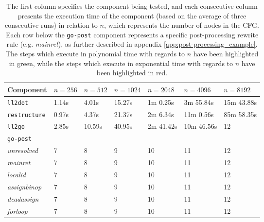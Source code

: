 \begin{table}[htbp]
	\begin{center}
		\begin{tabular}{|l|l|l|l|l|l|l|}
			\hline
			Component & $ n = 256 $ & $ n = 512 $ & $ n = 1024 $ & $ n = 2048 $ & $ n = 4096 $ & $ n = 8192 $ \\
			\hline
			\rowcolor{light_green_3}
			\texttt{ll2dot} & 1.14s & 4.01s & 15.27s & 1m 0.25s & 3m 55.84s & 15m 43.88s \\
			\rowcolor{light_green_3}
			\texttt{restructure} & 0.97s & 4.37s & 21.37s & 2m 6.34s & 11m 0.56s & 85m 58.35s \\
			\rowcolor{light_green_3}
			\texttt{ll2go} & 2.85s & 10.59s & 40.95s & 2m 41.42s & 10m 46.56s & 12 \\
			\hline
			\multicolumn{7}{|l|}{\texttt{go-post}} \\
			\hline
			\rowcolor{light_green_3}
			\textit{unresolved} & 7 & 8 & 9 & 10 & 11 & 12 \\
			\rowcolor{light_green_3}
			\textit{mainret} & 7 & 8 & 9 & 10 & 11 & 12 \\
			\rowcolor{light_red_3}
			\textit{localid} & 7 & 8 & 9 & 10 & 11 & 12 \\
			\rowcolor{light_green_3}
			\textit{assignbinop} & 7 & 8 & 9 & 10 & 11 & 12 \\
			\rowcolor{light_green_3}
			\textit{deadassign} & 7 & 8 & 9 & 10 & 11 & 12 \\
			\rowcolor{light_green_3}
			\textit{forloop} & 7 & 8 & 9 & 10 & 11 & 12 \\
			\hline
		\end{tabular}
	\end{center}
	\caption{The first column specifies the component being tested, and each consecutive column presents the execution time of the component (based on the average of three consecutive runs) in relation to $ n $, which represents the number of nodes in the CFG. Each row below the \texttt{go-post} component represents a specific post-processing rewrite rule (e.g. \textit{mainret}), as further described in appendix \ref{app:post-processing_example}. The steps which execute in polynomial time with regards to $ n $ have been highlighted in green, while the steps which execute in exponential time with regards to $ n $ have been highlighted in red.}
	\label{tbl:run_time_summary}
\end{table}

